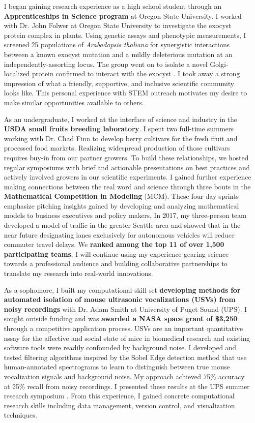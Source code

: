 \noindent
\underline{}
I began gaining research experience as a high school student through an \textbf{Apprenticeships in Science program} at Oregon State University.
I worked with Dr. John Folwer at Oregon State University to investigate the exocyst protein complex in plants.
Using genetic assays and phenotypic measurements, I screened 25 populations of \textit{Arabadopsis thaliana} for synergistic interactions between a known exocyst mutation and a mildly deleterious mutation at an independently-assorting locus.
The group went on to isolate a novel Golgi-localized protein confirmed to interact with the exocyst \cite{fowler}.
I took away a strong impression of what a friendly, supportive, and inclusive scientific community looks like.
This personal experience with STEM outreach motivates my desire to make similar opportunities available to others.

As an undergraduate, I worked at the interface of science and industry in the \textbf{USDA small fruits breeding laboratory}.
I spent two full-time summers working with Dr. Chad Finn to develop berry cultivars for the fresh fruit and processed food markets.
Realizing widespread production of those cultivars requires buy-in from our partner growers.
To build these relationships, we hosted regular symposiums with brief and actionable presentations on best practices and actively involved growers in our scientific experiments.
I gained further experience making connections between the real word and science through three bouts in the \textbf{Mathematical Competition in Modeling} (MCM).
These four day sprints emphasize pitching insights gained by developing and analyzing mathematical models to business executives and policy makers.
In 2017, my three-person team developed a model of traffic in the greater Seattle area and showed that in the near future designating lanes exclusively for autonomous vehicles will reduce commuter travel delays.
We \textbf{ranked among the top 11 of over 1,500 participating teams}.
I will continue using my experience gearing science towards a professional audience and building collaborative partnerships to translate my research into real-world innovations.

As a sophomore, I built my computational skill set \textbf{developing methods for automated isolation of mouse
ultrasonic vocalizations (USVs) from noisy recordings} with Dr. Adam Smith at University of Puget Sound (UPS).
I sought outside funding and was \textbf{awarded a NASA space grant of \$3,250} through a competitive application process.
USVs are an important quantitative assay for the affective and social state of mice in biomedical research and existing software tools were readily confounded by background noise.
I developed and tested filtering algorithms inspired by the Sobel Edge detection method that use human-annotated spectrograms to learn to distinguish between true mouse vocalization signals and background noise.
My approach achieved 75\% accuracy at 25\% recall from noisy recordings.
I presented these results at the UPS summer research symposium \cite{smith}.
From this experience, I gained concrete computational research skills including data management, version control, and visualization techniques.

